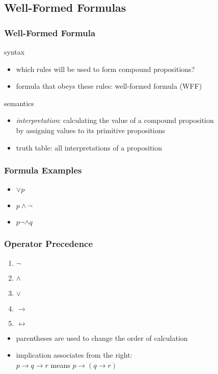 \documentclass[dvipsnames]{beamer}
\begin{document}
\subsection{Well-Formed Formulas}

\begin{frame}
  \frametitle{Well-Formed Formula}

  \begin{block}{syntax}
    \begin{itemize}
      \item which rules will be used to form compound propositions?
      \item formula that obeys these rules: \alert{well-formed formula} (WFF)
    \end{itemize}
  \end{block}

  \pause
  \begin{block}{semantics}
    \begin{itemize}
      \item \emph{interpretation}: calculating the value of a
        compound proposition\\
        by assigning values to its primitive propositions
      \item truth table: all interpretations of a proposition
    \end{itemize}
  \end{block}
\end{frame}

\begin{frame}
  \frametitle{Formula Examples}

  \begin{example}
    \begin{itemize}
      \item $\vee p$
      \item $p \wedge \neg$
      \item $p \neg \wedge q$
    \end{itemize}
  \end{example}
\end{frame}

\begin{frame}
  \frametitle{Operator Precedence}

  \begin{enumerate}
    \item $\neg$
    \item $\wedge$
    \item $\vee$
    \item $\rightarrow$
    \item $\leftrightarrow$
  \end{enumerate}

  \begin{itemize}
    \item parentheses are used to change the order of calculation
    \item implication associates from the right:\\
      $p \rightarrow q \rightarrow r$ means $p \rightarrow (q \rightarrow r)$
  \end{itemize}
\end{frame}
\end{document}
